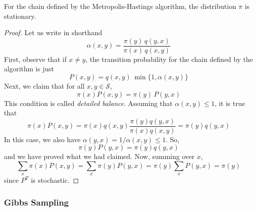     \begin{theorem}
      \label{thm:stationarity-of-metropolis-hastings}
      For the chain defined by the Metropolis-Hastings algorithm, the distribution $\pi$ is stationary. 
    \end{theorem}
    \begin{proof}
      Let us write in shorthand 
      \begin{equation}
        \alpha(x, y) = \frac{\pi(y)\, q(y, x)}{\pi(x)\, q(x, y)}
      \end{equation}
      First, observe that if $x \neq y$, the transition probability for the chain defined by the algorithm is just
      \begin{equation}
        P(x, y) = q(x, y)\, \min\{1, \alpha(x, y)\}
      \end{equation}
      Next, we claim that for all $x, y \in \mathcal{S}$, 
      \begin{equation}
        \pi(x) P(x, y) = \pi(y) \, P(y, x)
      \end{equation}
      This condition is called \textit{detailed balance}. Assuming that $\alpha(x, y) \leq 1$, it is true that
      \begin{equation}
        \pi(x) P(x, y) = \pi(x) q(x, y) \frac{\pi(y) q(y, x)}{\pi(x) q(x, y)} = \pi(y) q(y, x)
      \end{equation}
      In this case, we also have $\alpha(y, x) = 1 / \alpha(x, y) \leq 1$. So, 
      \begin{equation}
        \pi(y) P(y, x) = \pi(y) q(y, x)
      \end{equation}
      and we have proved what we had claimed. Now, summing over $x$,
      \begin{equation}
        \sum_x \pi(x) P(x, y) = \sum_x \pi(y) P(y, x) = \pi(y) \sum_x P(y, x) = \pi(y)
      \end{equation}
      since $P^T$ is stochastic. 
    \end{proof}

  \subsubsection{Gibbs Sampling}

